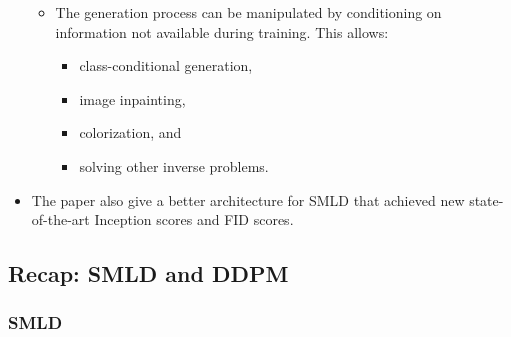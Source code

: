 \documentclass[10pt]{article}
\begin{document}
\begin{itemize}
\begin{itemize}
    \item The generation process can be manipulated by conditioning on information not available during training. This allows:
      \begin{itemize}
        \item class-conditional generation,
        \item image inpainting,
        \item colorization, and
        \item solving other inverse problems.
      \end{itemize}
  \end{itemize}

  \item The paper also give a better architecture for SMLD that achieved new state-of-the-art Inception scores and FID scores.
\end{itemize}

\subsection{Recap: SMLD and DDPM}

\subsubsection{SMLD}
\end{document}
